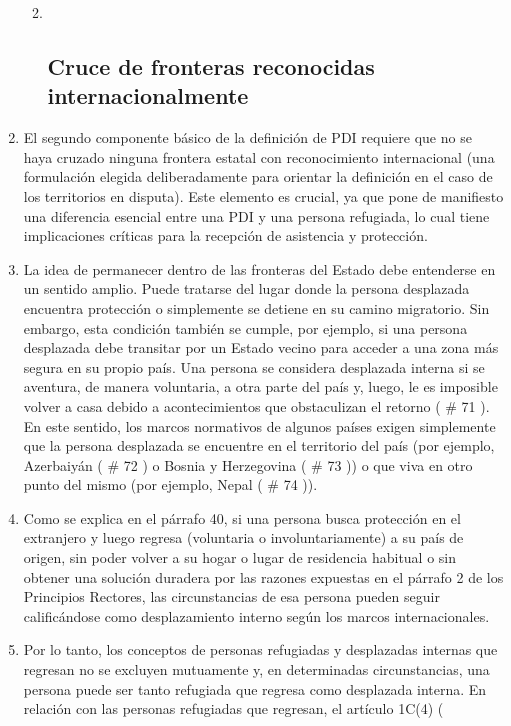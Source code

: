 \documentclass[
]{book}
\begin{document}
\begin{enumerate}
  \begin{enumerate}
  \def\labelenumii{\arabic{enumii}.}
  \item ~
    \hypertarget{cruce-de-fronteras-reconocidas-internacionalmente}{%
    \subsection{Cruce de fronteras reconocidas internacionalmente}\label{cruce-de-fronteras-reconocidas-internacionalmente}}
  \end{enumerate}
\item
  El segundo componente básico de la definición de PDI requiere que no se haya cruzado ninguna frontera estatal con reconocimiento internacional (una formulación elegida deliberadamente para orientar la definición en el caso de los territorios en disputa). Este elemento es crucial, ya que pone de manifiesto una diferencia esencial entre una PDI y una persona refugiada, lo cual tiene implicaciones críticas para la recepción de asistencia y protección.
\item
  La idea de permanecer dentro de las fronteras del Estado debe entenderse en un sentido amplio. Puede tratarse del lugar donde la persona desplazada encuentra protección o simplemente se detiene en su camino migratorio. Sin embargo, esta condición también se cumple, por ejemplo, si una persona desplazada debe transitar por un Estado vecino para acceder a una zona más segura en su propio país. Una persona se considera desplazada interna si se aventura, de manera voluntaria, a otra parte del país y, luego, le es imposible volver a casa debido a acontecimientos que obstaculizan el retorno (
  \# 71
  ). En este sentido, los marcos normativos de algunos países exigen simplemente que la persona desplazada se encuentre en el territorio del país (por ejemplo, Azerbaiyán (
  \# 72
  ) o Bosnia y Herzegovina (
  \# 73
  )) o que viva en otro punto del mismo (por ejemplo, Nepal (
  \# 74
  )).
\item
  Como se explica en el párrafo 40, si una persona busca protección en el extranjero y luego regresa (voluntaria o involuntariamente) a su país de origen, sin poder volver a su hogar o lugar de residencia habitual o sin obtener una solución duradera por las razones expuestas en el párrafo 2 de los Principios Rectores, las circunstancias de esa persona pueden seguir calificándose como desplazamiento interno según los marcos internacionales.
\item
  Por lo tanto, los conceptos de personas refugiadas y desplazadas internas que regresan no se excluyen mutuamente y, en determinadas circunstancias, una persona puede ser tanto refugiada que regresa como desplazada interna. En relación con las personas refugiadas que regresan, el artículo 1C(4) (

\end{enumerate}
\end{document}
